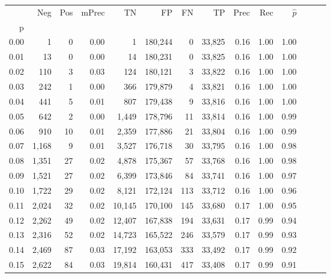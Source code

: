 \begin{tabular}{rrrrrrrrrrrrrr}
\toprule
{} &    Neg &  Pos & mPrec &       TN &       FP &      FN &      TP &  Prec &   Rec & $\hat{p}$ \\
p    &        &      &       &          &          &         &         &       &       &           \\
\midrule
0.00 &      1 &    0 &  0.00 &        1 &  180,244 &       0 &  33,825 &  0.16 &  1.00 &      1.00 \\
0.01 &     13 &    0 &  0.00 &       14 &  180,231 &       0 &  33,825 &  0.16 &  1.00 &      1.00 \\
0.02 &    110 &    3 &  0.03 &      124 &  180,121 &       3 &  33,822 &  0.16 &  1.00 &      1.00 \\
0.03 &    242 &    1 &  0.00 &      366 &  179,879 &       4 &  33,821 &  0.16 &  1.00 &      1.00 \\
0.04 &    441 &    5 &  0.01 &      807 &  179,438 &       9 &  33,816 &  0.16 &  1.00 &      1.00 \\
0.05 &    642 &    2 &  0.00 &    1,449 &  178,796 &      11 &  33,814 &  0.16 &  1.00 &      0.99 \\
0.06 &    910 &   10 &  0.01 &    2,359 &  177,886 &      21 &  33,804 &  0.16 &  1.00 &      0.99 \\
0.07 &  1,168 &    9 &  0.01 &    3,527 &  176,718 &      30 &  33,795 &  0.16 &  1.00 &      0.98 \\
0.08 &  1,351 &   27 &  0.02 &    4,878 &  175,367 &      57 &  33,768 &  0.16 &  1.00 &      0.98 \\
0.09 &  1,521 &   27 &  0.02 &    6,399 &  173,846 &      84 &  33,741 &  0.16 &  1.00 &      0.97 \\
0.10 &  1,722 &   29 &  0.02 &    8,121 &  172,124 &     113 &  33,712 &  0.16 &  1.00 &      0.96 \\
0.11 &  2,024 &   32 &  0.02 &   10,145 &  170,100 &     145 &  33,680 &  0.17 &  1.00 &      0.95 \\
0.12 &  2,262 &   49 &  0.02 &   12,407 &  167,838 &     194 &  33,631 &  0.17 &  0.99 &      0.94 \\
0.13 &  2,316 &   52 &  0.02 &   14,723 &  165,522 &     246 &  33,579 &  0.17 &  0.99 &      0.93 \\
0.14 &  2,469 &   87 &  0.03 &   17,192 &  163,053 &     333 &  33,492 &  0.17 &  0.99 &      0.92 \\
0.15 &  2,622 &   84 &  0.03 &   19,814 &  160,431 &     417 &  33,408 &  0.17 &  0.99 &      0.91 \\

\end{tabular}
